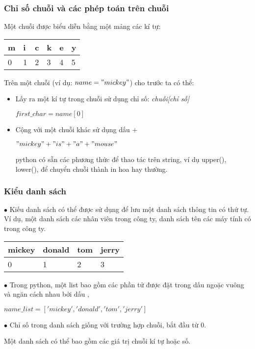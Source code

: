 \documentclass{beamer}
\begin{document}
\begin{frame}[label=stringoper]
\frametitle{Chỉ số chuỗi và các phép toán trên chuỗi }

Một chuỗi được biểu diễn bằng một mảng các kí tự:
\begin{center}
 \begin{tabular}{| l | l | l | l | l| l|}
    \hline
    m & i & c & k & e & y \\ \hline
    0 & 1 & 2 & 3 & 4 & 5 \\ \hline 

    \end{tabular}
\end{center}

Trên một chuỗi (ví dụ: $name = "mickey"$) cho trước ta có thể:    
\begin{itemize}
\item Lấy ra một kí tự trong chuỗi sử dụng chỉ số: \textit{chuỗi[chỉ số]}
\begin{example}
$first\_char = name[0]$ 
\end{example} 
\item Cộng với một chuỗi khác sử dụng dấu $+$
\begin{example}
$"mickey" + " is" + " a" + " mouse" $
\end{example} 
 python có sẵn các phương thức để thao tác trên string, ví dụ upper(), lower(), để chuyển chuỗi thành in hoa hay thường.

\end{itemize}
\hyperlink{cautrucdulieu}{}
\end{frame}

\begin{frame}[label=list]
\frametitle{Kiểu danh sách }

$\bullet$ Kiếu danh sách có thể được sử dụng để lưu một danh sách thông tin có thứ tự. 
Ví dụ, một danh sách các nhân viên trong công ty, danh sách tên các máy tính có trong công ty.
\begin{center}
 \begin{tabular}{| l | l | l | l |}
    \hline
    mickey & donald & tom & jerry  \\ \hline
    0 & 1 & 2 & 3  \\ \hline 

    \end{tabular}
\end{center}

$\bullet$ Trong python, một list bao gồm các phần tử được đặt trong dấu ngoặc vuông và ngăn cách nhau bởi dấu $,$    

\begin{example}
$name\_list = ['mickey', 'donald', 'tom', 'jerry']$ 
\end{example} 

$\bullet$ Chỉ số trong danh sách giống với trường hợp chuỗi, bắt đầu từ 0.

 Một danh sách có thể bao gồm các giá trị chuỗi kí tự hoặc số.

\hyperlink{cautrucdulieu}{}
\end{frame}
\end{document}
